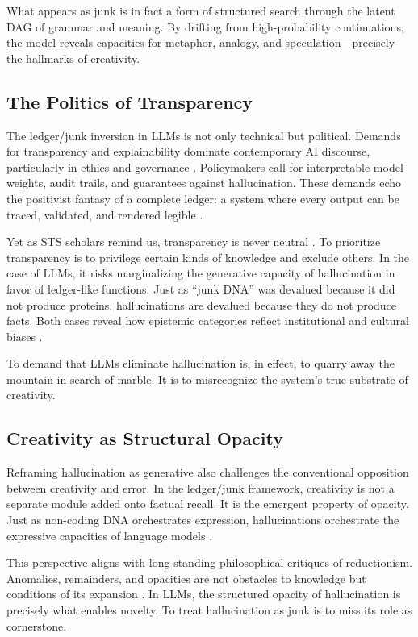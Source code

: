 \documentclass[12pt]{article}
\begin{document}
What appears as junk is in fact a form of structured search through the latent DAG of grammar and meaning. By drifting from high-probability continuations, the model reveals capacities for metaphor, analogy, and speculation---precisely the hallmarks of creativity.

\subsection{The Politics of Transparency}
The ledger/junk inversion in LLMs is not only technical but political. Demands for transparency and explainability dominate contemporary AI discourse, particularly in ethics and governance \citep{burrell2016}. Policymakers call for interpretable model weights, audit trails, and guarantees against hallucination. These demands echo the positivist fantasy of a complete ledger: a system where every output can be traced, validated, and rendered legible \citep{scott1998}.

Yet as STS scholars remind us, transparency is never neutral \citep{jasanoff2004, haraway1988}. To prioritize transparency is to privilege certain kinds of knowledge and exclude others. In the case of LLMs, it risks marginalizing the generative capacity of hallucination in favor of ledger-like functions. Just as ``junk DNA'' was devalued because it did not produce proteins, hallucinations are devalued because they do not produce facts. Both cases reveal how epistemic categories reflect institutional and cultural biases \citep{glissant1997}.

To demand that LLMs eliminate hallucination is, in effect, to quarry away the mountain in search of marble. It is to misrecognize the system’s true substrate of creativity.

\subsection{Creativity as Structural Opacity}
Reframing hallucination as generative also challenges the conventional opposition between creativity and error. In the ledger/junk framework, creativity is not a separate module added onto factual recall. It is the emergent property of opacity. Just as non-coding DNA orchestrates expression, hallucinations orchestrate the expressive capacities of language models \citep{rheinberger1997}.

This perspective aligns with long-standing philosophical critiques of reductionism. Anomalies, remainders, and opacities are not obstacles to knowledge but conditions of its expansion \citep{kuhn1962, feyerabend1975}. In LLMs, the structured opacity of hallucination is precisely what enables novelty. To treat hallucination as junk is to miss its role as cornerstone.
\end{document}
